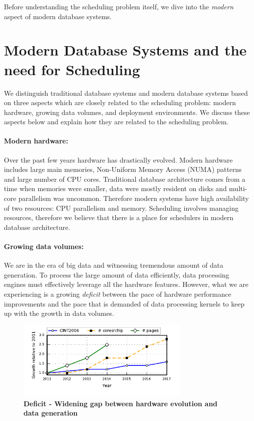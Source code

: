 Before understanding the scheduling problem itself, we dive into the \textit{modern} aspect of modern database systems.

\section{Modern Database Systems and the need for Scheduling}
We distinguish traditional database systems and modern database systems based on three aspects which are closely related to the scheduling problem: modern hardware, growing data volumes, and deployment environments.
We discuss these aspects below and explain how they are related to the scheduling problem. 
\paragraph{Modern hardware:} 
Over the past few years hardware has drastically evolved. 
Modern hardware includes large main memories, Non-Uniform Memory Access (NUMA) patterns and large number of CPU cores.
Traditional database architecture comes from a time when memories were smaller, data were mostly resident on disks and multi-core parallelism was uncommon. 
Therefore modern systems have high availability of two resources: CPU parallelism and memory.
Scheduling involves managing resources, therefore we believe that there is a place for schedulers in modern database architecture. 
\paragraph{Growing data volumes:}
We are in the era of big data and witnessing tremendous amount of data generation.
To process the large amount of data efficiently, data processing engines must effectively leverage all the hardware features. 
However, what we are experiencing is a growing \textit{deficit} between the pace of hardware performance improvements and the pace that is demanded of data processing kernels to keep up with the growth in data volumes.

\begin{figure}
	\centering
	\includegraphics[width=0.75\textwidth]{system/figures/deficit.pdf}
	\caption{\textbf{Deficit - Widening gap between hardware evolution and data generation}}
	\label{fig-deficit}
\end{figure}

